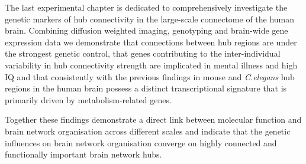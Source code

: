 The last experimental chapter is dedicated to comprehensively investigate the genetic markers of hub connectivity in the large-scale connectome of the human brain. Combining diffusion weighted imaging, genotyping and brain-wide gene expression data we demonstrate that connections between hub regions are under the strongest genetic control, that genes contributing to the inter-individual variability in hub connectivity strength are implicated in mental illness and high IQ and that consistently with the previous findings in mouse and \textit{C.elegans} hub regions in the human brain possess a distinct transcriptional signature that is primarily driven by metabolism-related genes.

Together these findings demonstrate a direct link between molecular function and brain network organisation across different scales and indicate that the genetic influences on brain network organisation converge on highly connected and functionally important brain network hubs. 

